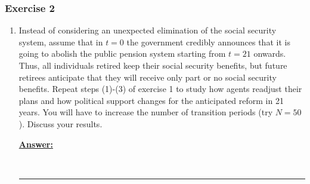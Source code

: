 \documentclass{article} %
\theoremstyle{definition}
\newenvironment{solution}[1][Answer]{\begin{singlespace}\underline{\textbf{#1:}}\quad }{\ \rule{0.3em}{0.3em}\end{singlespace}} %
\begin{document}
	\subsubsection*{Exercise 2}
	\begin{enumerate}
		\item Instead of considering an unexpected elimination of the social security system, assume that in $ t = 0 $ the government credibly announces that it is going to abolish the public pension system starting from $ t = 21 $ onwards. Thus, all individuals retired keep their social security benefits, but future retirees anticipate that they will receive only part or no social security benefits. Repeat steps (1)-(3) of exercise 1 to study how agents readjust their plans and how political support changes for the anticipated reform in 21 years. You will have to increase the number of transition periods (try $ N = 50 $). Discuss your results.
		\begin{solution}
				
		\end{solution}
	\end{enumerate}
\end{document}
